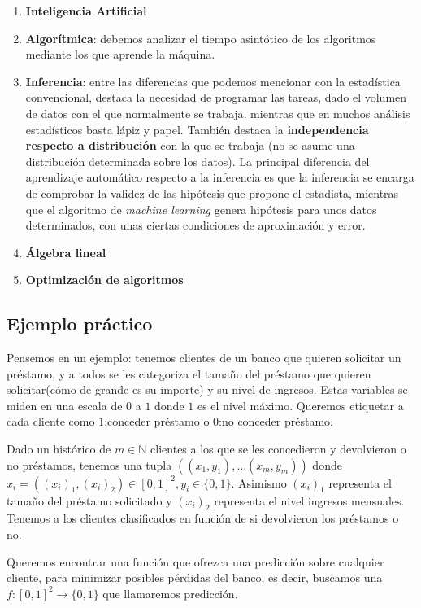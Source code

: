 \begin{enumerate}[i]
 \item \textbf{Inteligencia Artificial}
 \item \textbf{Algorítmica}: debemos analizar el tiempo asintótico de los algoritmos mediante los que aprende la máquina.
 \item \textbf{Inferencia}: entre las diferencias que podemos mencionar con la estadística convencional, destaca la necesidad de 
 programar las tareas, dado el volumen de datos con el que normalmente se trabaja, mientras que en muchos análisis estadísticos basta 
 lápiz y papel. También destaca la \textbf{independencia respecto a distribución} con la que se trabaja (no se asume una distribución
 determinada sobre los datos). La principal diferencia del aprendizaje automático respecto a la inferencia es que la inferencia
 se encarga de comprobar la validez de las hipótesis que propone el estadista, mientras que el algoritmo de 
 \textit{machine learning} genera hipótesis para unos datos determinados, con unas ciertas condiciones de aproximación y error.
 \item \textbf{Álgebra lineal}
 \item \textbf{Optimización de algoritmos}
\end{enumerate}

\subsection{Ejemplo práctico}\label{sec:first-ex}
Pensemos en un ejemplo: tenemos clientes de un banco que quieren solicitar un préstamo, y a todos se les categoriza
el tamaño del préstamo que quieren solicitar(cómo de grande es su importe) y su nivel de ingresos. Estas variables se miden 
en una escala de $0$ a $1$ donde $1$ es el nivel máximo. Queremos etiquetar a cada cliente como $1$:conceder préstamo o 
$0$:no conceder préstamo.

Dado un histórico de $m\in \mathbb{N}$ clientes a los que se les concedieron y devolvieron o no préstamos, tenemos una tupla 
$((x_1, y_1), \ldots (x_m, y_m))$ donde $x_i = ((x_i)_1, (x_i)_2) \in [0,1]^2, y_i \in \{0,1\}$. Asimismo $(x_i)_1$ representa el 
tamaño del préstamo solicitado y $(x_i)_2$ representa el nivel ingresos mensuales. Tenemos a los clientes clasificados en 
función de si devolvieron los préstamos o no.

Queremos encontrar una función que ofrezca una predicción sobre cualquier cliente, para minimizar posibles pérdidas del banco, es
decir, buscamos una $f:[0,1]^2 \rightarrow \{0,1\}$ que llamaremos predicción.

